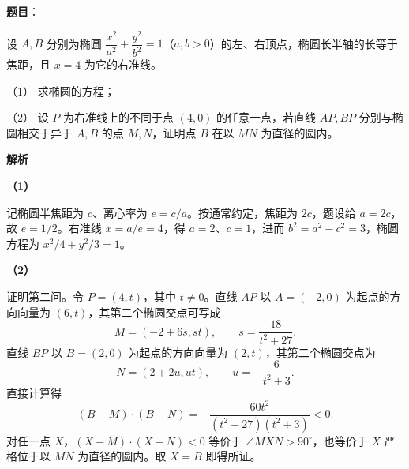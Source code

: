 \begin{answer}

\textbf{题目}：

设 $A,B$ 分别为椭圆 $\dfrac{x^2}{a^2}+\dfrac{y^2}{b^2}=1$（$a,b>0$）的左、右顶点，椭圆长半轴的长等于焦距，且 $x=4$ 为它的右准线。

（1） 求椭圆的方程；

（2） 设 $P$ 为右准线上的不同于点 $(4,0)$ 的任意一点，若直线 $AP,BP$ 分别与椭圆相交于异于 $A,B$ 的点 $M,N$，证明点 $B$ 在以 $MN$ 为直径的圆内。

\textbf{解析}

\textbf{（1）}

记椭圆半焦距为 $c$、离心率为 $e=c/a$。按通常约定，焦距为 $2c$，题设给 $a=2c$，故 $e=1/2$。右准线 $x=a/e=4$，得 $a=2$、$c=1$，进而 $b^2=a^2-c^2=3$，椭圆方程为 $x^2/4+y^2/3=1$。

\textbf{（2）}

证明第二问。令 $P=(4,t)$，其中 $t\ne0$。直线 $AP$ 以 $A=(-2,0)$ 为起点的方向向量为 $(6,t)$，其第二个椭圆交点可写成
\nopagebreak[4]
\[
M=(-2+6s,st),\qquad s=\frac{18}{t^2+27}.
\]
直线 $BP$ 以 $B=(2,0)$ 为起点的方向向量为 $(2,t)$，其第二个椭圆交点为
\nopagebreak[4]
\[
N=(2+2u,ut),\qquad u=-\frac6{t^2+3}.
\]
直接计算得
\nopagebreak[4]
\[
(B-M)\cdot(B-N)=-\frac{60t^2}{(t^2+27)(t^2+3)}<0.
\]
对任一点 $X$，$(X-M)\cdot(X-N)<0$ 等价于 $\angle MXN>90^\circ$，也等价于 $X$ 严格位于以 $MN$ 为直径的圆内。取 $X=B$ 即得所证。



\end{answer}